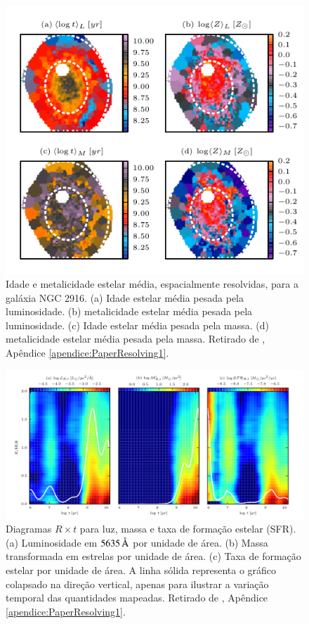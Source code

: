 \begin{figure}
	\includegraphics{figuras/at-aZ-K0277}
	\caption[Idade estelar e metalidade espacialmente resolvidas para a
	galáxia NGC 2916] {Idade e metalicidade estelar média, espacialmente
	resolvidas, para a galáxia NGC 2916. (a) Idade estelar média pesada pela
	luminosidade. (b) metalicidade estelar média pesada pela luminosidade.
	(c) Idade estelar média pesada pela massa. (d) metalicidade estelar
	média pesada pela massa. Retirado de
	\citet[figura 6]{CidFernandes2013}, Apêndice \ref{apendice:PaperResolving1}.}
	\label{fig:ataZMap}
\end{figure}

\begin{figure}
	\includegraphics[width=1.0\columnwidth]{figuras/L-M-SFR-K0277}
	\caption[Diagramas $R \times t$ para luz, massa e SFR] {Diagramas $R \times t$
	para luz, massa e taxa de formação estelar (SFR). (a) Luminosidade em
	$5635\,\text{\normalfont\AA}$ por unidade de área.  (b) Massa transformada em estrelas por
	unidade de área. (c) Taxa de formação estelar por unidade de área. A linha
	sólida representa o gráfico colapsado na direção vertical, apenas para ilustrar
	a variação temporal das quantidades mapeadas. Retirado de
	\citet[figura 12]{CidFernandes2013}, Apêndice \ref{apendice:PaperResolving1}.}
	\label{fig:LMSFR2D}
\end{figure}

